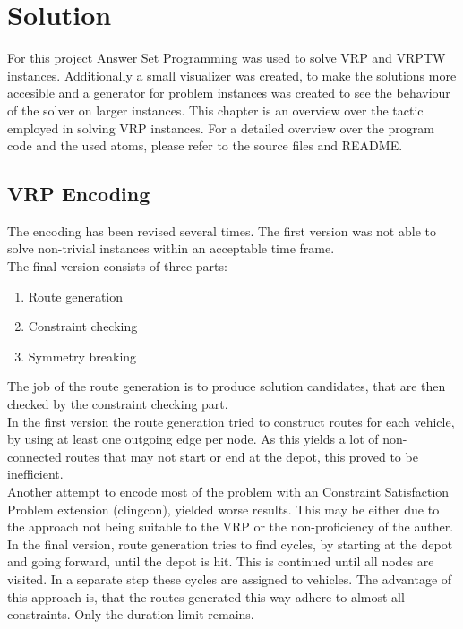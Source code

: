 \documentclass[12pt, letterpaper]{article}
\begin{document}
\section{Solution}
For this project Answer Set Programming was used to solve VRP and VRPTW instances. Additionally a small visualizer was created, to make the solutions more accesible and a generator for problem instances was created to see the behaviour of the solver on larger instances.
This chapter is an overview over the tactic employed in solving VRP instances. For a detailed overview over the program code and the used atoms, please refer to the source files and README.

\subsection{VRP Encoding}
The encoding has been revised several times. The first version was not able to solve non-trivial instances within an acceptable time frame.\\
The final version consists of three parts:
\begin{enumerate}
	\item Route generation
	\item Constraint checking
	\item Symmetry breaking
\end{enumerate}

The job of the route generation is to produce solution candidates, that are then checked by the constraint checking part.\\
In the first version the route generation tried to construct routes for each vehicle, by using at least one outgoing edge per node. As this yields a lot of non-connected routes that may not start or end at the depot, this proved to be inefficient.\\
Another attempt to encode most of the problem with an Constraint Satisfaction Problem extension (clingcon), yielded worse results. This may be either due to the approach not being suitable to the VRP or the non-proficiency of the auther.\\
In the final version, route generation tries to find cycles, by starting at the depot and going forward, until the depot is hit. This is continued until all nodes are visited. In a separate step these cycles are assigned to vehicles. The advantage of this approach is, that the routes generated this way adhere to almost all constraints. Only the duration limit remains.\\
\end{document}
